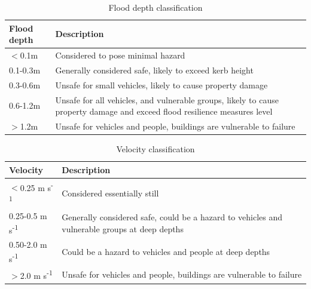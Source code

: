 \documentclass[APA,Times2COL]{WileyNJDv5}
\begin{document}
\begingroup
\setlength\tabcolsep{0pt}
\renewcommand{\arraystretch}{1.5} %
\begin{table}[h!]
\centering
\caption{Flood depth classification \citep{envagency2019}}
\begin{tabular}{C{3cm} C{14cm}} 
 \hline
 \textbf{Flood depth} & \textbf{Description} \\ [0.5ex] 
 \hline
 $<$0.1m & Considered to pose minimal hazard \\
 0.1-0.3m & Generally considered safe, likely to exceed kerb height \\
 0.3-0.6m & Unsafe for small vehicles, likely to cause property damage \\
 0.6-1.2m & Unsafe for all vehicles, and vulnerable groups, likely to cause property damage and exceed flood resilience measures level\\
 $>$1.2m & Unsafe for vehicles and people, buildings are vulnerable to failure \\
 [1ex] 
 \hline
\end{tabular}
\label{table:depth_cats}
\end{table}

\setlength\tabcolsep{0pt}
\renewcommand{\arraystretch}{1.5} %
\begin{table}[h!]
\centering
\caption{Velocity classification \citep{envagency2019}}
\begin{tabular}{C{3cm} C{14cm}} 
 \hline
 \textbf{Velocity} & \textbf{Description} \\ [0.5ex] 
 \hline
 $<$0.25 m s\textsuperscript{-1} & Considered essentially still \\
 0.25-0.5 m s\textsuperscript{-1} & Generally considered safe, could be a hazard to vehicles and vulnerable 
groups at deep depths \\
 0.50-2.0 m s\textsuperscript{-1} & Could be a hazard to vehicles and people at deep depths\\
 $>$2.0 m s\textsuperscript{-1} & Unsafe for vehicles and people, buildings are vulnerable to failure\\[1ex] 
 \hline
\end{tabular}
\label{table:velocity_cats}
\end{table}
\end{document}
